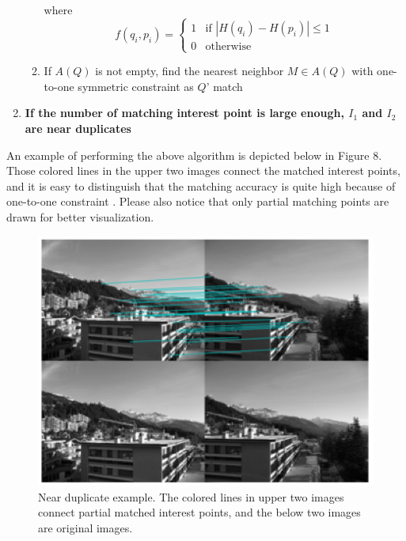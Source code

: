 \begin{enumerate}
\begin{enumerate}
    where 
    \begin{equation*}
        f(q_i, p_i) = \begin{cases}
                   1     & \text{if } \left|H(q_i) - H(p_i)\right| \leq 1\\
                   0 & \text{otherwise}
               \end{cases}
    \end{equation*}

    \item {If $A(Q)$ is not empty, find the nearest neighbor $M \in A(Q)$ with one-to-one symmetric constraint as $Q$' match}
    \end{enumerate}

  \item{\bfseries If the number of matching interest point is large enough, $I_1$ and $I_2$ are near duplicates}
\end{enumerate}

\noindent An example of performing the above algorithm is depicted below in Figure 8. Those colored lines in the upper two images connect the matched interest points, and it is easy to distinguish that the matching accuracy is quite high because of one-to-one constraint \cite{zhao2007near}. Please also notice that only partial matching points are drawn for better visualization. 
  \begin{figure}[!ht]
  \centering
    \includegraphics[]{./match.png}
  \caption{Near duplicate example. The colored lines in upper two images connect partial matched interest points, and the below two images are original images.}
  \end{figure}

